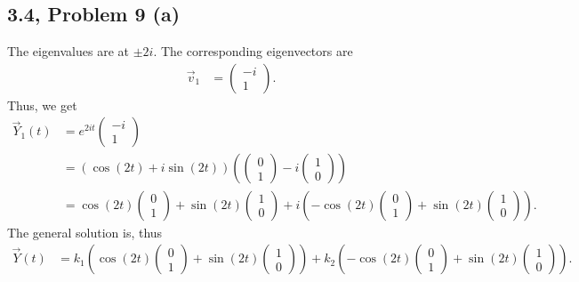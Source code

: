 \documentclass[10pt]{mypackage}
\begin{document}
\subsection{3.4, Problem 9 (a)}%
The eigenvalues are at $\pm 2i$. The corresponding eigenvectors are
\begin{align*}
  \vec{v}_1 &= \begin{pmatrix}-i\\1\end{pmatrix}.
\end{align*}
Thus, we get
\begin{align*}
  \vec{Y}_1(t) &= e^{2it} \begin{pmatrix}-i\\1\end{pmatrix}\\
               &= \left(\cos\left(2t\right) + i\sin\left(2t\right)\right) \left( \begin{pmatrix}0\\1\end{pmatrix} - i \begin{pmatrix}1\\0\end{pmatrix}\right)\\
               &= \cos\left(2t\right) \begin{pmatrix}0\\1\end{pmatrix} + \sin\left(2t\right) \begin{pmatrix}1\\0\end{pmatrix} + i\left(-\cos\left(2t\right) \begin{pmatrix}0\\1\end{pmatrix} + \sin\left(2t\right) \begin{pmatrix}1\\0\end{pmatrix}\right).
\end{align*}
The general solution is, thus
\begin{align*}
  \vec{Y}(t) &= k_1\left(\cos\left(2t\right) \begin{pmatrix}0\\1\end{pmatrix} + \sin\left(2t\right) \begin{pmatrix}1\\0\end{pmatrix}\right) + k_2\left(-\cos\left(2t\right) \begin{pmatrix}0\\1\end{pmatrix} + \sin\left(2t\right) \begin{pmatrix}1\\0\end{pmatrix}\right).
\end{align*}
\end{document}
